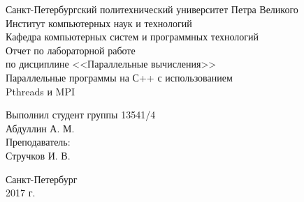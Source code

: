 	\begin{titlepage}
		\begin{center}
			Санкт-Петербургский политехнический	университет Петра Великого\\
			Институт компьютерных наук и технологий\\
			Кафедра компьютерных систем и программных технологий\\
			\vspace{6cm}
			Отчет по лабораторной работе\\
			по дисциплине <<Параллельные вычисления>>\\
			\Large
			Параллельные программы на С++ с использованием\\
			Pthreads и MPI\\
			\small
		\end{center}
		\vspace{3cm}
		\begin{flushright}
			Выполнил студент группы 13541/4\\
			Абдуллин А. М.\\
			\vspace{1cm}			
			Преподаватель:\\
			Стручков И. В.\\
		\end{flushright}
		\vspace{4cm}
		\begin{center}
			Санкт-Петербург\\
			2017 г.\\
		\end{center}
	\end{titlepage}
	\newpage